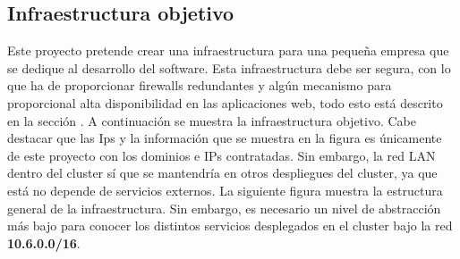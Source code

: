 \subsection{Infraestructura objetivo}
\label{infraestructura_objetivo}
\begin{text}
	Este proyecto pretende crear una infraestructura para una pequeña empresa que se dedique al desarrollo del software. Esta infraestructura debe ser segura, con lo que ha de proporcionar firewalls redundantes y algún mecanismo para proporcional alta disponibilidad en las aplicaciones web, todo esto está descrito en la sección .  A continuación se muestra la infraestructura objetivo. Cabe destacar que las Ips y la información que se muestra en la figura es únicamente de este proyecto con los dominios e IPs contratadas. Sin embargo, la red LAN dentro del cluster sí que se mantendría en otros despliegues del cluster, ya que está no depende de servicios externos. La siguiente figura muestra la estructura general de la infraestructura. Sin embargo, es necesario un nivel de abstracción más bajo para conocer los distintos servicios desplegados en el cluster bajo la red \textbf{10.6.0.0/16}.
	
	\clearpage
	

\end{text}
